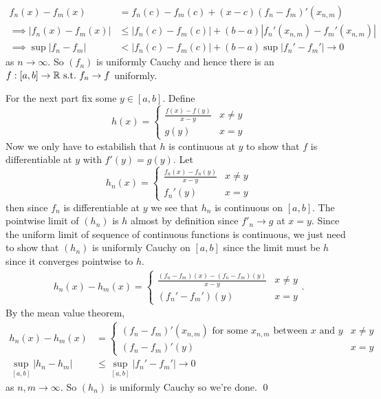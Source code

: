 \documentclass{article}
\begin{document}
\begin{align*}
	f_n(x)-f_m(x)&=f_n(c)-f_m(c)+(x-c)(f_n-f_m)'(x_{n,m}) \\
	\implies |f_n(x)-f_m(x)|&\le |f_n(c)-f_m(c)|+(b-a)|f_n'(x_{n,m})-f_m'(x_{n,m})|\\
	\implies \sup|f_n-f_m|&<|f_n(c)-f_m(c)|+(b-a)\sup|f_n'-f_m'|\to 0
\end{align*}
as $ n\to\infty $. So $ (f_n) $ is uniformly Cauchy and hence there is an $ f : [a,b]\to \mathbb{R} \text{ s.t.\ } f_n\to f$ uniformly.\par
For the next part fix some $ y\in [a,b] $. Define
\[
  h(x)=\begin{cases}
	  \frac{f(x)-f(y)}{x-y} & x\ne y \\
	  g(y) & x=y
  \end{cases}
\]
Now we only have to estabilish that $ h $ is continuous at $ y $ to show that $ f $ is differentiable at $ y $ with $ f'(y)=g(y) $. Let
\[
  h_n(x)=\begin{cases}
	  \frac{f_n(x)-f_n(y)}{x-y} & x\ne y\\
	  f_n'(y) & x = y 
  \end{cases}
\]
then since $ f_n $ is differentiable at $ y $ we see that $ h_n $ is continuous on $ [a,b] $. The pointwise limit of $ (h_n) $ is $ h $ almost by definition since $ f'_n\to g $ at $ x=y $. Since the uniform limit of sequence of continuous functions is continuous, we just need to show that $ (h_n) $ is uniformly Cauchy on $ [a,b] $ since the limit must be $ h $ since it converges pointwise to $ h $.
\begin{align*}
  h_n(x)-h_m(x)=\begin{cases}
	  \frac{(f_n-f_m)(x)-(f_n-f_m)(y)}{x-y} & x\ne y \\
	  (f_n'-f_m')(y) & x=y
  \end{cases}.
\end{align*}
By the mean value theorem,
\begin{align*}
	h_n(x)-h_m(x)&=\begin{cases}
	  (f_n-f_m)'(x_{n,m}) \text{ for some } x_{n,m} \text{ between } x \text{ and } y & x\ne y\\
	  (f_n-f_m)'(y) & x=y
  \end{cases}\\
		\sup_{[a,b]}|h_n-h_m|&\le \sup_{[a,b]}|f_n'-f_m'|\to 0
\end{align*}
as $ n,m\to \infty $. So $ (h_n) $ is uniformly Cauchy so we're done. \qed
\end{document}
